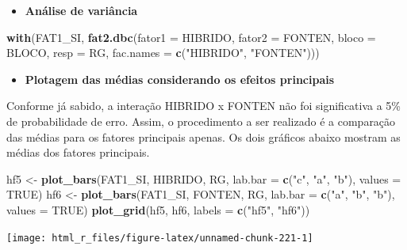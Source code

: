 \documentclass[
]{book}
\newenvironment{Shaded}{\begin{snugshade}}{\end{snugshade}}
\newcommand{\DataTypeTok}[1]{\textcolor[rgb]{0.13,0.29,0.53}{#1}}
\newcommand{\KeywordTok}[1]{\textcolor[rgb]{0.13,0.29,0.53}{\textbf{#1}}}
\newcommand{\NormalTok}[1]{#1}
\newcommand{\OtherTok}[1]{\textcolor[rgb]{0.56,0.35,0.01}{#1}}
\newcommand{\StringTok}[1]{\textcolor[rgb]{0.31,0.60,0.02}{#1}}
\providecommand{\tightlist}{%
  \setlength{\itemsep}{0pt}\setlength{\parskip}{0pt}}
\begin{document}
\begin{itemize}
\tightlist
\item
  \textbf{Análise de variância}
\end{itemize}

\begin{Shaded}
\begin{Highlighting}[]
\KeywordTok{with}\NormalTok{(FAT1_SI,}
     \KeywordTok{fat2.dbc}\NormalTok{(}\DataTypeTok{fator1 =}\NormalTok{  HIBRIDO,}
              \DataTypeTok{fator2 =}\NormalTok{  FONTEN,}
              \DataTypeTok{bloco =}\NormalTok{ BLOCO,}
              \DataTypeTok{resp =}\NormalTok{  RG,}
              \DataTypeTok{fac.names =} \KeywordTok{c}\NormalTok{(}\StringTok{"HIBRIDO"}\NormalTok{, }\StringTok{"FONTEN"}\NormalTok{)))}
\end{Highlighting}
\end{Shaded}

\begin{itemize}
\tightlist
\item
  \textbf{Plotagem das médias considerando os efeitos principais}
\end{itemize}

Conforme já sabido, a interação HIBRIDO x FONTEN não foi significativa a 5\% de probabilidade de erro. Assim, o procedimento a ser realizado é a comparação das médias para os fatores principais apenas. Os dois gráficos abaixo mostram as médias dos fatores principais.

\begin{Shaded}
\begin{Highlighting}[]
\NormalTok{hf5 <-}\StringTok{ }\KeywordTok{plot_bars}\NormalTok{(FAT1_SI, HIBRIDO, RG, }\DataTypeTok{lab.bar =} \KeywordTok{c}\NormalTok{(}\StringTok{"c"}\NormalTok{, }\StringTok{"a"}\NormalTok{, }\StringTok{"b"}\NormalTok{), }\DataTypeTok{values =} \OtherTok{TRUE}\NormalTok{)}
\NormalTok{hf6 <-}\StringTok{ }\KeywordTok{plot_bars}\NormalTok{(FAT1_SI, FONTEN, RG, }\DataTypeTok{lab.bar =} \KeywordTok{c}\NormalTok{(}\StringTok{"a"}\NormalTok{, }\StringTok{"b"}\NormalTok{, }\StringTok{"b"}\NormalTok{), }\DataTypeTok{values =} \OtherTok{TRUE}\NormalTok{)}
\KeywordTok{plot_grid}\NormalTok{(hf5, hf6, }\DataTypeTok{labels =} \KeywordTok{c}\NormalTok{(}\StringTok{"hf5"}\NormalTok{, }\StringTok{"hf6"}\NormalTok{))}
\end{Highlighting}
\end{Shaded}

\begin{center}\texttt{[image: html\_r\_files/figure-latex/unnamed-chunk-221-1]} \end{center}
\end{document}
